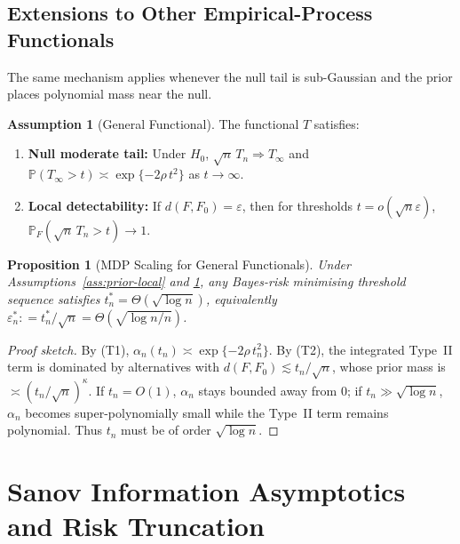 \documentclass[11pt]{article}
\newcommand{\defeq}{\mathrel{\mathop:}=}
\newcommand{\rhotail}{\rho}  %
\newcommand{\1}{\mathbf{1}}
\newcommand{\PP}{\mathbb{P}}
\theoremstyle{plain}
\newtheorem{proposition}[theorem]{Proposition}
\theoremstyle{definition}
\newtheorem{assumption}[theorem]{Assumption}
\theoremstyle{remark}
\begin{document}
\subsection{Extensions to Other Empirical-Process Functionals}\label{subsec:extensions}

The same mechanism applies whenever the null tail is sub-Gaussian and the prior places polynomial mass near the null.

\begin{assumption}[General Functional]\label{ass:general-functional}
The functional $T$ satisfies:
\begin{enumerate}[label=(T\arabic*),leftmargin=2.4em]
\item \textbf{Null moderate tail:} Under $H_0$, $\sqrt{n}\,T_n \Rightarrow T_\infty$ and
$\PP(T_\infty>t)\asymp\exp\{-2\rhotail\, t^2\}$ as $t\to\infty$.
\item \textbf{Local detectability:} If $d(F,F_0)=\varepsilon$, then for thresholds $t=o(\sqrt{n}\varepsilon)$,
$\PP_F(\sqrt{n}\,T_n>t)\to 1$.
\end{enumerate}
\end{assumption}

\begin{proposition}[MDP Scaling for General Functionals]\label{prop:general-mdp}
Under Assumptions~\ref{ass:prior-local} and \ref{ass:general-functional}, any Bayes-risk minimising threshold sequence satisfies
$t_n^* = \Theta(\sqrt{\log n})$, equivalently $\varepsilon_n^*\defeq t_n^*/\sqrt{n} = \Theta(\sqrt{\log n/n})$.
\end{proposition}

\begin{proof}[Proof sketch]
By (T1), $\alpha_n(t_n)\asymp \exp\{-2\rhotail\, t_n^2\}$.
By (T2), the integrated Type~II term is dominated by alternatives with $d(F,F_0)\lesssim t_n/\sqrt{n}$, whose prior mass is $\asymp (t_n/\sqrt{n})^{\kappa}$.
If $t_n=O(1)$, $\alpha_n$ stays bounded away from $0$; if $t_n\gg \sqrt{\log n}$, $\alpha_n$ becomes super-polynomially small while the Type~II term remains polynomial. Thus $t_n$ must be of order $\sqrt{\log n}$.
\end{proof}


\section{Sanov Information Asymptotics and Risk Truncation}
\label{sec:sanov}
\end{document}
